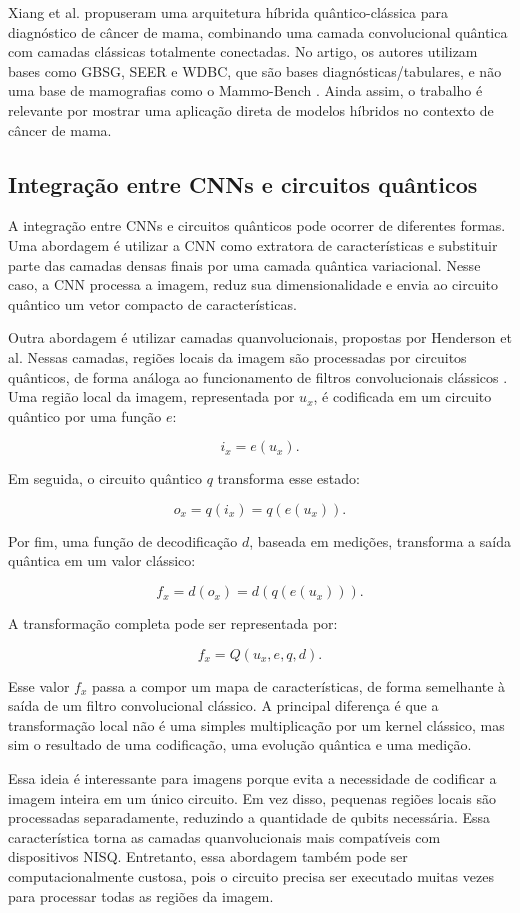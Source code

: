 \documentclass[
    12pt,
    openright,
    oneside,
    a4paper,
    english,
    brazil
]{abntex2}
\begin{document}
Xiang et al. propuseram uma arquitetura híbrida quântico-clássica para diagnóstico de câncer de mama, combinando uma camada convolucional quântica com camadas clássicas totalmente conectadas. No artigo, os autores utilizam bases como GBSG, SEER e WDBC, que são bases diagnósticas/tabulares, e não uma base de mamografias como o Mammo-Bench \cite{xiang2024qccnn}. Ainda assim, o trabalho é relevante por mostrar uma aplicação direta de modelos híbridos no contexto de câncer de mama.

\subsection{Integração entre CNNs e circuitos quânticos}

A integração entre CNNs e circuitos quânticos pode ocorrer de diferentes formas. Uma abordagem é utilizar a CNN como extratora de características e substituir parte das camadas densas finais por uma camada quântica variacional. Nesse caso, a CNN processa a imagem, reduz sua dimensionalidade e envia ao circuito quântico um vetor compacto de características.

Outra abordagem é utilizar camadas quanvolucionais, propostas por Henderson et al. Nessas camadas, regiões locais da imagem são processadas por circuitos quânticos, de forma análoga ao funcionamento de filtros convolucionais clássicos \cite{henderson2020quanvolutional}. Uma região local da imagem, representada por \(u_x\), é codificada em um circuito quântico por uma função \(e\):

\[
i_x = e(u_x).
\]

Em seguida, o circuito quântico \(q\) transforma esse estado:

\[
o_x = q(i_x) = q(e(u_x)).
\]

Por fim, uma função de decodificação \(d\), baseada em medições, transforma a saída quântica em um valor clássico:

\[
f_x = d(o_x) = d(q(e(u_x))).
\]

A transformação completa pode ser representada por:

\[
f_x = Q(u_x, e, q, d).
\]

Esse valor \(f_x\) passa a compor um mapa de características, de forma semelhante à saída de um filtro convolucional clássico. A principal diferença é que a transformação local não é uma simples multiplicação por um kernel clássico, mas sim o resultado de uma codificação, uma evolução quântica e uma medição.

Essa ideia é interessante para imagens porque evita a necessidade de codificar a imagem inteira em um único circuito. Em vez disso, pequenas regiões locais são processadas separadamente, reduzindo a quantidade de qubits necessária. Essa característica torna as camadas quanvolucionais mais compatíveis com dispositivos NISQ. Entretanto, essa abordagem também pode ser computacionalmente custosa, pois o circuito precisa ser executado muitas vezes para processar todas as regiões da imagem.
\end{document}
